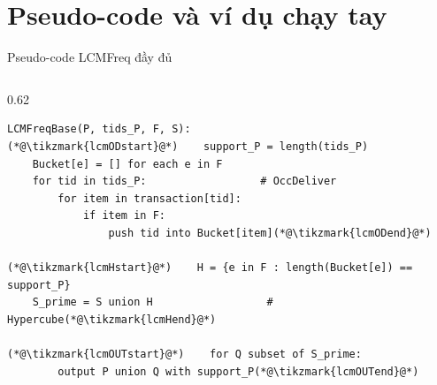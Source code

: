 \documentclass[9pt, aspectratio=169]{beamer}
\newcommand{\tikzmark}[1]{\tikz[remember picture,overlay,baseline]\coordinate (#1);}
\begin{document}
\section{Pseudo-code và ví dụ chạy tay}

\begin{frame}[fragile]{Pseudo-code LCMFreq đầy đủ}
  \begin{columns}[T,onlytextwidth]
    \begin{column}{0.62\textwidth}
\begin{lstlisting}
LCMFreqBase(P, tids_P, F, S):
(*@\tikzmark{lcmODstart}@*)    support_P = length(tids_P)
    Bucket[e] = [] for each e in F
    for tid in tids_P:                  # OccDeliver
        for item in transaction[tid]:
            if item in F:
                push tid into Bucket[item](*@\tikzmark{lcmODend}@*)

(*@\tikzmark{lcmHstart}@*)    H = {e in F : length(Bucket[e]) == support_P}
    S_prime = S union H                  # Hypercube(*@\tikzmark{lcmHend}@*)

(*@\tikzmark{lcmOUTstart}@*)    for Q subset of S_prime:
        output P union Q with support_P(*@\tikzmark{lcmOUTend}@*)


\end{lstlisting}
\end{column}
\end{columns}
\end{frame}
\end{document}
